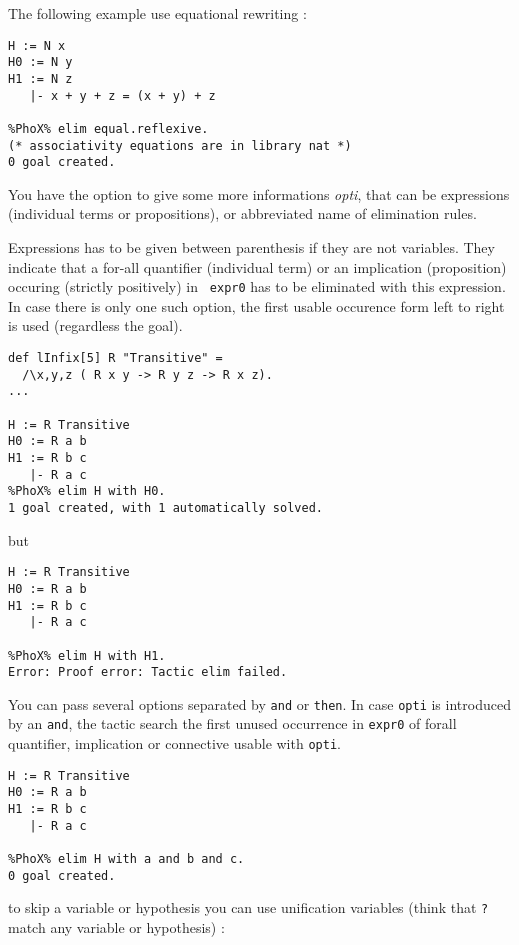 \begin{description}
The following example use equational rewriting :

\begin{verbatim}
H := N x
H0 := N y
H1 := N z
   |- x + y + z = (x + y) + z

%PhoX% elim equal.reflexive.  
(* associativity equations are in library nat *)
0 goal created.

\end{verbatim}

You have the option to give some more informations {\em opti}, that can
be expressions (individual terms or propositions), or abbreviated name
of elimination rules.

Expressions has to be given between parenthesis if they are not
variables. They indicate that a for-all quantifier (individual term) or
an implication (proposition) occuring (strictly positively) in {\tt
  expr0} has to be eliminated with this expression. In case there is
only one such option, the first usable occurence form left to right is
used (regardless the goal).

\begin{verbatim}
def lInfix[5] R "Transitive" = 
  /\x,y,z ( R x y -> R y z -> R x z).
...

H := R Transitive
H0 := R a b
H1 := R b c
   |- R a c
%PhoX% elim H with H0.  
1 goal created, with 1 automatically solved.
\end{verbatim}

but

\begin{verbatim}
H := R Transitive
H0 := R a b
H1 := R b c
   |- R a c

%PhoX% elim H with H1.  
Error: Proof error: Tactic elim failed.
\end{verbatim}

You can pass several options separated by {\tt and} or {\tt then}. In
case {\tt opti} is introduced by an {\tt and}, the tactic search the
first unused occurrence in {\tt expr0} of forall quantifier, implication
or connective usable with {\tt opti}.

\begin{verbatim}
H := R Transitive
H0 := R a b
H1 := R b c
   |- R a c

%PhoX% elim H with a and b and c.  
0 goal created.
\end{verbatim}

to skip a variable or hypothesis you can use unification variables
(think that {\tt ?} match any variable or hypothesis) :


\end{description}
